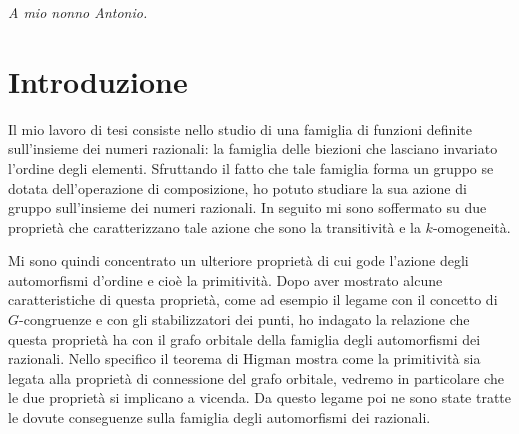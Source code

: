 \documentclass[12pt,a4paper,openright]{report}
\author{De Cecco Paolo}
\newcommand{\0}{\setminus\{0\}} %
\theoremstyle{definition}
\theoremstyle{plain}
\begin{document}


\begin{titlepage}                      
	\thispagestyle{empty} 
	\topmargin=6.5cm                        
	\raggedleft                             
	\large                                
	
	\em                                     
	A mio nonno Antonio.
	
	\newpage  
	\clearpage{\pagestyle{empty}\cleardoublepage} %
\end{titlepage}

\newpage
\null
\thispagestyle{empty}
\newpage


\thispagestyle{empty}
\newpage
\chapter*{Introduzione}



Il mio lavoro di tesi consiste nello studio di una famiglia di funzioni definite sull'insieme dei numeri razionali: la famiglia delle biezioni che lasciano invariato l'ordine degli elementi. 
Sfruttando il fatto che tale famiglia forma un gruppo se dotata dell'operazione di composizione, ho potuto studiare la sua azione di gruppo sull'insieme dei numeri razionali. 
In seguito mi sono soffermato su due proprietà che caratterizzano tale azione che sono la transitività e la $k$-omogeneità.

Mi sono quindi concentrato un ulteriore proprietà di cui gode l'azione degli automorfismi d'ordine e cioè la primitività. Dopo aver mostrato alcune caratteristiche di questa proprietà, come ad esempio il legame con il concetto di $G$-congruenze e con gli stabilizzatori dei punti, ho indagato la relazione che questa proprietà ha con il grafo orbitale della famiglia degli automorfismi dei razionali. Nello specifico il teorema di Higman mostra come la primitività sia legata alla proprietà di connessione del grafo orbitale, vedremo in particolare che le due proprietà si implicano a vicenda. Da questo legame poi ne sono state tratte le dovute conseguenze sulla famiglia degli automorfismi dei razionali.
\end{document}
